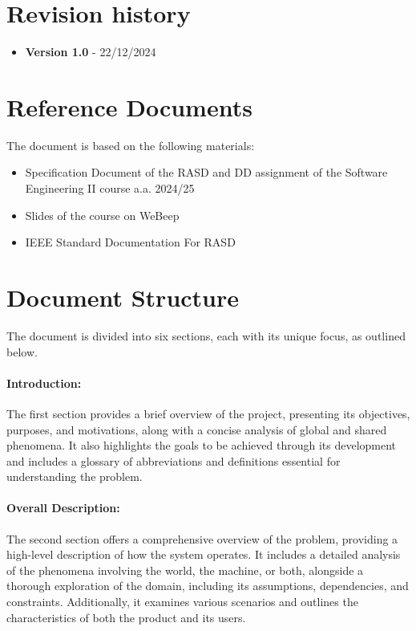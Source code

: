 \section{Revision history}
\label{sec:revision_history}%
\begin{itemize}
    \item \textbf{Version 1.0} - 22/12/2024
\end{itemize}


\section{Reference Documents}
\label{sec:reference_documents}%
The document is based on the following materials:
\begin{itemize}
    \item Specification Document of the RASD and DD assignment of the Software Engineering II course a.a. 2024/25
    \item Slides of the course on WeBeep
    \item IEEE Standard Documentation For RASD 
\end{itemize}

\newpage

\section{Document Structure}
\label{sec:document_structure}%
The document is divided into six sections, each with its unique focus, as outlined below.
\paragraph{Introduction:} The first section provides a brief overview of the project, presenting its objectives, purposes, and motivations, along with a concise analysis of global and shared phenomena. It also highlights the goals to be achieved through its development and includes a glossary of abbreviations and definitions essential for understanding the problem.
\paragraph{Overall Description:} The second section offers a comprehensive overview of the problem, providing a high-level description of how the system operates. It includes a detailed analysis of the phenomena involving the world, the machine, or both, alongside a thorough exploration of the domain, including its assumptions, dependencies, and constraints. Additionally, it examines various scenarios and outlines the characteristics of both the product and its users.
